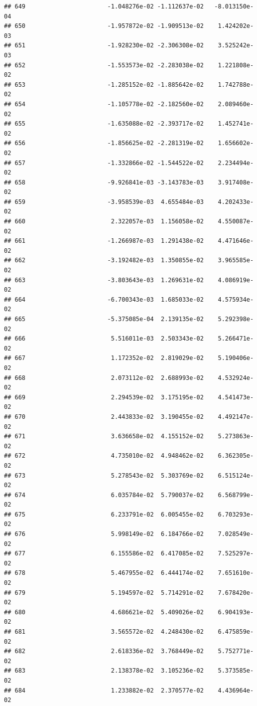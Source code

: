 \documentclass[
]{article}
\begin{document}
\begin{verbatim}
## 649                       -1.048276e-02 -1.112637e-02   -8.013150e-04
## 650                       -1.957872e-02 -1.909513e-02    1.424202e-03
## 651                       -1.928230e-02 -2.306308e-02    3.525242e-03
## 652                       -1.553573e-02 -2.283038e-02    1.221808e-02
## 653                       -1.285152e-02 -1.885642e-02    1.742788e-02
## 654                       -1.105778e-02 -2.182560e-02    2.089460e-02
## 655                       -1.635088e-02 -2.393717e-02    1.452741e-02
## 656                       -1.856625e-02 -2.281319e-02    1.656602e-02
## 657                       -1.332866e-02 -1.544522e-02    2.234494e-02
## 658                       -9.926841e-03 -3.143783e-03    3.917408e-02
## 659                       -3.958539e-03  4.655484e-03    4.202433e-02
## 660                        2.322057e-03  1.156058e-02    4.550087e-02
## 661                       -1.266987e-03  1.291438e-02    4.471646e-02
## 662                       -3.192482e-03  1.350855e-02    3.965585e-02
## 663                       -3.803643e-03  1.269631e-02    4.086919e-02
## 664                       -6.700343e-03  1.685033e-02    4.575934e-02
## 665                       -5.375085e-04  2.139135e-02    5.292398e-02
## 666                        5.516011e-03  2.503343e-02    5.266471e-02
## 667                        1.172352e-02  2.819029e-02    5.190406e-02
## 668                        2.073112e-02  2.688993e-02    4.532924e-02
## 669                        2.294539e-02  3.175195e-02    4.541473e-02
## 670                        2.443833e-02  3.190455e-02    4.492147e-02
## 671                        3.636658e-02  4.155152e-02    5.273863e-02
## 672                        4.735010e-02  4.948462e-02    6.362305e-02
## 673                        5.278543e-02  5.303769e-02    6.515124e-02
## 674                        6.035784e-02  5.790037e-02    6.568799e-02
## 675                        6.233791e-02  6.005455e-02    6.703293e-02
## 676                        5.998149e-02  6.184766e-02    7.028549e-02
## 677                        6.155586e-02  6.417085e-02    7.525297e-02
## 678                        5.467955e-02  6.444174e-02    7.651610e-02
## 679                        5.194597e-02  5.714291e-02    7.678420e-02
## 680                        4.686621e-02  5.409026e-02    6.904193e-02
## 681                        3.565572e-02  4.248430e-02    6.475859e-02
## 682                        2.618336e-02  3.768449e-02    5.752771e-02
## 683                        2.138378e-02  3.105236e-02    5.373585e-02
## 684                        1.233882e-02  2.370577e-02    4.436964e-02

\end{verbatim}
\end{document}
